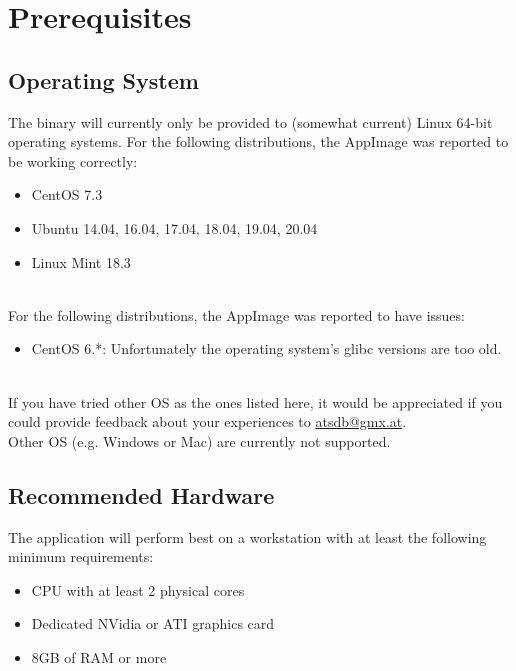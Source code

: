 \section{Prerequisites}

\subsection{Operating System}

The binary will currently only be provided to (somewhat current) Linux 64-bit operating systems. For the following distributions, the AppImage was reported to be working correctly:

\begin{itemize}  
\item CentOS 7.3
\item Ubuntu 14.04, 16.04, 17.04, 18.04, 19.04, 20.04
\item Linux Mint 18.3
\end{itemize}
\ \\

For the following distributions, the AppImage was reported to have issues:

\begin{itemize}  
\item CentOS 6.*: Unfortunately the operating system's glibc versions are too old.
\end{itemize}
\ \\

If you have tried other OS as the ones listed here, it would be appreciated if you could provide feedback about your experiences to \href{mailto:atsdb@gmx.at}{atsdb@gmx.at}.\\

Other OS (e.g. Windows or Mac) are currently not supported.

\subsection{Recommended Hardware}

The application will perform best on a workstation with at least the following minimum requirements:

\begin{itemize}  
\item CPU with at least 2 physical cores
\item Dedicated NVidia or ATI graphics card
\item 8GB of RAM or more
\end{itemize}
\ \\

